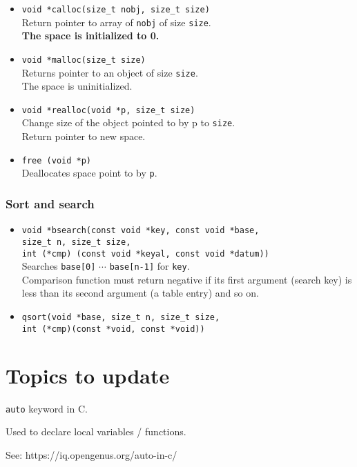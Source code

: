\begin{multicols*}{3}
\begin{itemize}
\item \texttt{void *calloc(size\_t nobj, size\_t size)}\\
Return pointer to array of \texttt{nobj} of size \texttt{size}.\\
\textbf{The space is initialized to 0.}

\item \texttt{void *malloc(size\_t size)}\\
Returns pointer to an object of size \texttt{size}.\\
The space is uninitialized.\\

\item \texttt{void *realloc(void *p, size\_t size)}\\
Change size of the object pointed to by p to \texttt{size}.\\
Return pointer to new space.\\

\item \texttt{free (void *p)}\\
Deallocates space point to by \texttt{p}.\\

\end{itemize}

\subsubsection{Sort and search}

\begin{itemize}
	\item \texttt{void *bsearch(const void *key, const void *base, \\
	size\_t n, size\_t size, \\
	int (*cmp) (const void *keyal, const void *datum))}\\
	Searches \texttt{base[0]} $\cdots$ \texttt{base[n-1]} for \texttt{key}.\\
	Comparison function must return negative if its first argument (search key) is less than its second argument (a table entry) and so on. 

	\item \texttt{qsort(void *base, size\_t n, size\_t size, \\
	int (*cmp)(const *void, const *void))}
\end{itemize}


\vfill \null

\pagebreak

\section{Topics to update}

\texttt{auto} keyword in C.

Used to declare local variables / functions.

See: https://iq.opengenus.org/auto-in-c/

\end{multicols*}



